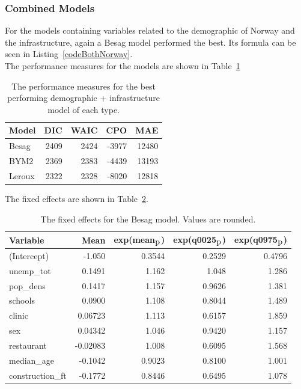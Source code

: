 \subsubsection{Combined Models}
For the models containing variables related to the demographic of Norway and the infrastructure, again a Besag model performed the best. Its formula can be seen in Listing~\ref{codeBothNorway}. \\
The performance measures for the models are shown in Table~\ref{bothNorway}
\begin{table}[H] 
\caption{The performance measures for the best performing demographic + infrastructure model of each type. \label{bothNorway}}
\begin{tabular}{l r r r r}
\toprule
\textbf{Model}	& \textbf{DIC}	& \textbf{WAIC} & \textbf{CPO} & \textbf{MAE} \\
\midrule
Besag  & 2409 & 2424 & -3977 & 12480 \\
BYM2 & 2369 & 2383 & -4439 & 13193\\
Leroux &  2322 & 2328 & -8020 & 12818\\
\bottomrule
\end{tabular}
\end{table}
The fixed effects are shown in Table~\ref{fixedAllNorway}.
\begin{table}[H] 
\caption{The fixed effects for the Besag model. Values are rounded. \label{fixedAllNorway}}
\begin{tabular}{l r r r r}
\toprule
\textbf{Variable}	& \textbf{Mean}	& \textbf{exp(mean$_{\hbox{p}}$)} & \textbf{exp(q0025$_{\hbox{p}}$)} & \textbf{exp(q0975$_{\hbox{p}}$)} \\
\midrule
(Intercept) & -1.050 & 0.3544 & 0.2529 & 0.4796\\
unemp\_tot & 0.1491 & 1.162 & 1.048 & 1.286 \\
pop\_dens & 0.1417 & 1.157 & 0.9626 & 1.381 \\
schools & 0.0900 & 1.108 & 0.8044 & 1.489 \\
clinic & 0.06723 & 1.113 & 0.6157 & 1.859 \\
sex & 0.04342 & 1.046 & 0.9420 & 1.157 \\
restaurant & -0.02083 & 1.008 & 0.6095 & 1.568 \\
median\_age & -0.1042 & 0.9023 & 0.8100 & 1.001 \\
construction\_ft & -0.1772 & 0.8446 & 0.6495 & 1.078 \\
\bottomrule
\end{tabular}
\end{table}
